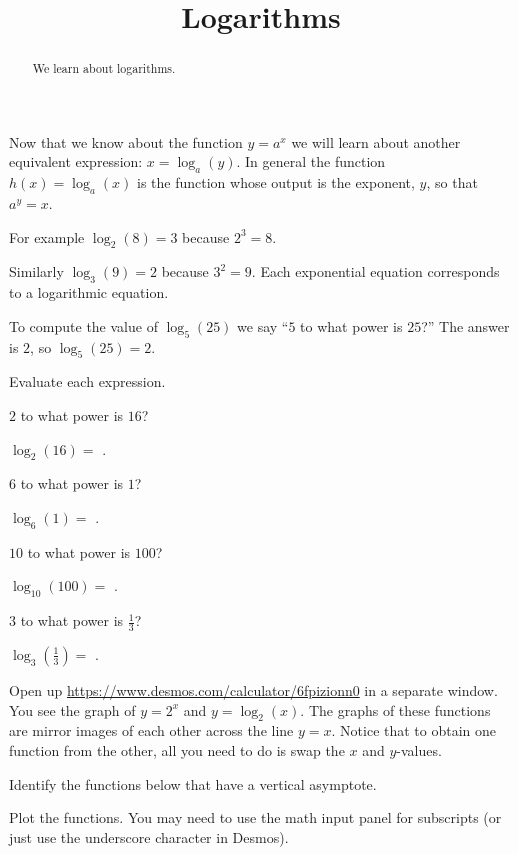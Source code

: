 \documentclass{ximera}
\title{Logarithms}
\begin{document}
\begin{abstract}
We learn about logarithms.
\end{abstract}
\maketitle

Now that we know about the function $y=a^x$ we will learn about another equivalent expression: $x=\log_a(y)$. In general the function $h(x)=\log_a(x)$ is the function whose output is the exponent, $y$, so that $a^y=x$.

For example $\log_2(8)=3$ because $2^3=8$. 

Similarly $\log_3(9)=2$ because $3^2=9$. Each exponential equation corresponds to a logarithmic equation. 

To compute the value of $\log_5(25)$ we say ``$5$ to what power is $25$?'' The answer is $2$, so $\log_5(25)=2$.

\begin{question}
Evaluate each expression.

\begin{hint}
$2$ to what power is $16$? 
\end{hint}
$\log_2(16)=$ .
\begin{hint}
$6$ to what power is $1$? 
\end{hint}
$\log_6(1)=$ .
\begin{hint}
$10$ to what power is $100$? 
\end{hint}
$\log_{10}(100)=$ .
\begin{hint}
$3$ to what power is $\frac{1}{3}$? 
\end{hint}
$\log_{3}\left(\frac{1}{3}\right)=$ .

\end{question}



Open up \href{https://www.desmos.com/calculator/6fpizionn0}{https://www.desmos.com/calculator/6fpizionn0} in a separate window. You see the graph of $y=2^x$ and $y=\log_2(x)$. The graphs of these functions are mirror images of each other across the line $y=x$. Notice that to obtain one function from the other, all you need to do is swap the $x$ and $y$-values. 

\begin{question}
Identify the functions below that have a vertical asymptote.

    \begin{hint}
      Plot the functions. You may need to use the math input panel for subscripts (or just use the underscore character in Desmos).
    \end{hint}
    \begin{multipleChoice}
    \end{multipleChoice}

\end{question}
\end{document}
